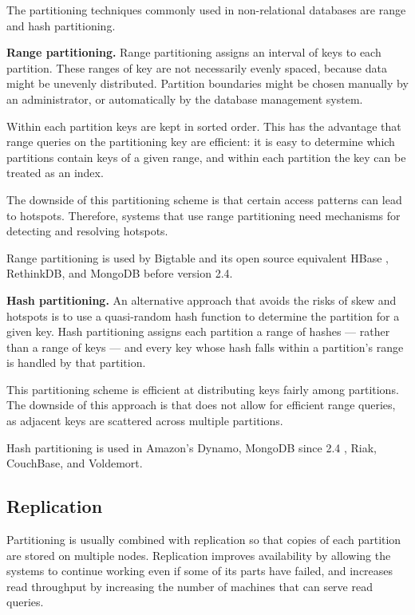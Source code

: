 \medskip
\noindent
The partitioning techniques commonly used in non-relational databases are range and hash partitioning.

\bigskip
\noindent
\textbf{Range partitioning.}
Range partitioning assigns an interval of keys to each partition.
These ranges of key are not necessarily evenly spaced, because data might be unevenly distributed.
Partition boundaries might be chosen manually by an administrator, or automatically by the database management system.

Within each partition keys are kept in sorted order.
This has the advantage that range queries on the partitioning key are efficient:
it is easy to determine which partitions contain keys of a given range, and within each partition the key can be treated
as an index.

The downside of this partitioning scheme is that certain access patterns can lead to hotspots.
Therefore, systems that use range partitioning need mechanisms for detecting and resolving hotspots.

Range partitioning is used by Bigtable and its open source equivalent HBase \cite{hbasebigtable:comparison},
RethinkDB, and MongoDB before version 2.4.

\bigskip
\noindent
\textbf{Hash partitioning.}
An alternative approach that avoids the risks of skew and hotspots is to use a quasi-random hash function to determine the partition
for a given key.
Hash partitioning assigns each partition a range of hashes --- rather than a range of keys --- and every key whose hash
falls within a partition's range is handled by that partition.

This partitioning scheme is efficient at distributing keys fairly among partitions.
The downside of this approach is that does not allow for efficient range queries,
as adjacent keys are scattered across multiple partitions.

Hash partitioning is used in Amazon's Dynamo, MongoDB since 2.4 \cite{mongo:hashpartitioning}, Riak, CouchBase,
and Voldemort.

\subsection{Replication}
\label{sec:replication}

Partitioning is usually combined with replication so that copies of each partition are stored on multiple nodes.
Replication improves availability by allowing the systems to continue working even if some of its parts have failed,
and increases read throughput by increasing the number of machines that can serve read queries.

